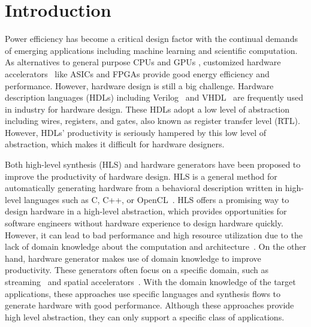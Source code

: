 \section{Introduction}
Power efficiency has become a critical design factor with the continual demands of emerging applications including machine learning and scientific computation. As alternatives to general purpose CPUs and GPUs , customized hardware accelerators~\cite{extensor, fpdnn, bigdata_fpga} like ASICs and FPGAs provide good energy efficiency and performance. However, hardware design is still a big challenge. Hardware description languages (HDLs) including Verilog~\cite{verilog} and VHDL~\cite{vhdl} are frequently used in industry for hardware design. These HDLs adopt a low level of abstraction including wires, registers, and gates, also known as register transfer level (RTL). However, HDLs' productivity is seriously hampered by this low level of abstraction, which makes it difficult for hardware designers.

Both high-level synthesis (HLS) and hardware generators have been proposed to improve the productivity of hardware design. HLS is a general method for automatically generating hardware from a behavioral description written in high-level languages such as C, C++, or OpenCL~\cite{Dynamatic_Josipovi, uIR_Sharifian, flexcl}. HLS offers a promising way to design hardware in a high-level abstraction, which provides opportunities for software engineers without hardware experience to design hardware quickly. However, it can lead to bad performance and high resource utilization due to the lack of domain knowledge about the computation and architecture~\cite{hls_liang}. On the other hand, hardware generator makes use of domain knowledge to improve productivity. These generators often focus on a specific domain, such as streaming~\cite{aetherling,parallel_pattern} and spatial accelerators~\cite{tensorlib,ems}. With the domain knowledge of the target applications, these approaches use specific languages and synthesis flows to generate hardware with good performance. Although these approaches provide high level abstraction, they can only support a specific class of applications.


